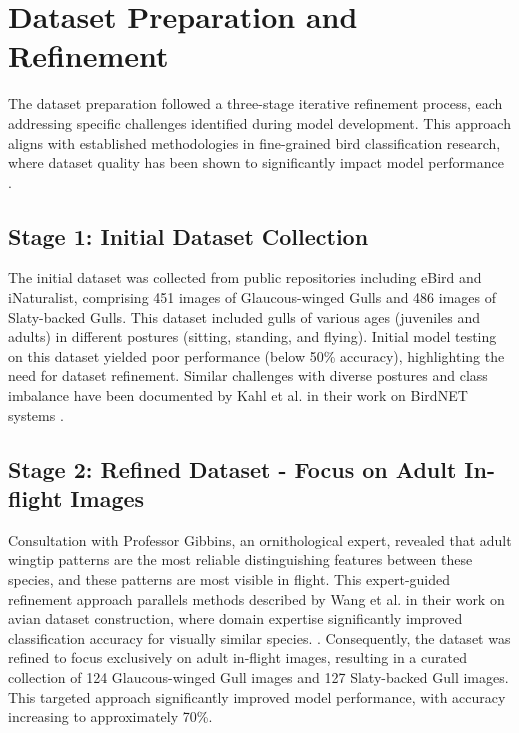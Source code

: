 \section{Dataset Preparation and Refinement}

The dataset preparation followed a three-stage iterative refinement process, each addressing specific challenges identified during model development. This approach aligns with established methodologies in fine-grained bird classification research, where dataset quality has been shown to significantly impact model performance \citep{ghani2024}.

\subsection{Stage 1: Initial Dataset Collection}

The initial dataset was collected from public repositories including eBird and iNaturalist, comprising 451 images of Glaucous-winged Gulls and 486 images of Slaty-backed Gulls. This dataset included gulls of various ages (juveniles and adults) in different postures (sitting, standing, and flying). Initial model testing on this dataset yielded poor performance (below 50\% accuracy), highlighting the need for dataset refinement. Similar challenges with diverse postures and class imbalance have been documented by Kahl et al. in their work on BirdNET systems \citep{kahl2021}.




\subsection{Stage 2: Refined Dataset - Focus on Adult In-flight Images}

Consultation with Professor Gibbins, an ornithological expert, revealed that adult wingtip patterns are the most reliable distinguishing features between these species, and these patterns are most visible in flight. This expert-guided refinement approach parallels methods described by Wang et al. in their work on avian dataset construction, where domain expertise significantly improved classification accuracy for visually similar species. \citep{wang2022}. Consequently, the dataset was refined to focus exclusively on adult in-flight images, resulting in a curated collection of 124 Glaucous-winged Gull images and 127 Slaty-backed Gull images. This targeted approach significantly improved model performance, with accuracy increasing to approximately 70\%.

